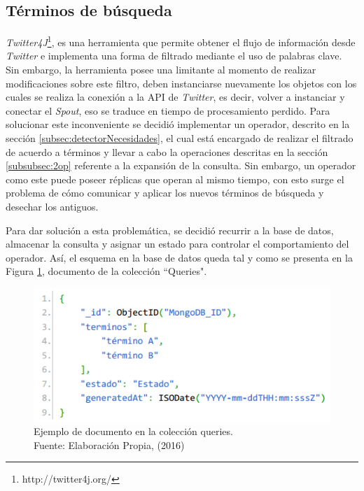 \subsection{Términos de búsqueda}
\label{sec:diseno:termBusqueda}

\textit{Twitter4J}\footnote{http://twitter4j.org/}, es una herramienta que permite obtener el flujo de información desde \textit{Twitter} e implementa una forma de filtrado mediante el uso de palabras clave. Sin embargo, la herramienta posee una limitante al momento de realizar modificaciones sobre este filtro, deben instanciarse nuevamente los objetos con los cuales se realiza la conexión a la API de \textit{Twitter}, es decir, volver a instanciar y conectar el \textit{Spout}, eso se traduce en tiempo de procesamiento perdido. Para solucionar este inconveniente se decidió implementar un operador, descrito en la sección \ref{subsec:detectorNecesidades}, el cual está encargado de realizar el filtrado de acuerdo a términos y llevar a cabo la operaciones descritas en la sección \ref{subsubsec:2op} referente a la expansión de la consulta. Sin embargo, un operador como este puede poseer réplicas que operan al mismo tiempo, con esto surge el problema de cómo comunicar y aplicar los nuevos términos de búsqueda y desechar los antiguos.

Para dar solución a esta problemática, se decidió recurrir a la base de datos, almacenar la consulta y asignar un estado para controlar el comportamiento del operador. Así, el esquema en la base de datos queda tal y como se presenta en la Figura \ref{fig:esquemaQuery}, documento de la colección ``Queries".

\begin{figure}[H]
	\centering
	\captionsetup{justification=centering}
	\includegraphics[scale=0.8]{images/Query.png}
	\caption[Ejemplo de documento en la colección queries.]{Ejemplo de documento en la colección queries.\\Fuente: Elaboración Propia, (2016)}
	\label{fig:esquemaQuery}
\end{figure}

